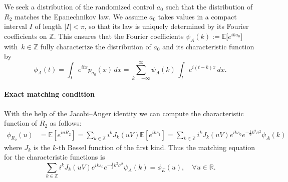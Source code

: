 \documentclass[reqno, 11pt]{amsart}%
\newcommand\EE{\mathbb E}
\newcommand\ZZ{\mathbb Z}
\theoremstyle{definition}
\begin{document}
We seek a distribution of the randomized control $a_0$ such that the distribution of $R_2$ matches the Epanechnikov law. 
We assume $a_0$ takes values in a compact interval $I$ of length $|I|<\pi$, so that its law is uniquely determined by its Fourier coefficients on $\mathbb Z$. This ensures that the Fourier coefficients $\psi_A(k):=\EE\big[e^{ik a_0}\big]$ with $\,k\in\ZZ $ fully characterize the distribution of $a_0$ and its  characteristic function by 
\begin{equation}
\phi_A(t) = \int_I e^{itx}p_{a_0}(x)\,dx = \sum_{k=-\infty}^{\infty} \psi_A(k)\,\int_I e^{i(t-k)x}\,dx.
\end{equation}

\paragraph{Exact matching condition}
With the help of the Jacobi--Anger identity we can compute the characteristic function of $R_2$ as follows:
\begin{align*}
\phi_{R_2}(u) &= \EE[e^{iu R_2}] = \sum_{k\in\mathbb Z} i^k J_k(u V)\EE[e^{iks_1}] = \sum_{k\in\mathbb Z} i^k J_k(u V )e^{iks_0}e^{-\frac12 k^2\sigma^2}\psi_A(k)
\end{align*}
where $J_k$ is the $k$-th Bessel function of the first kind. Thus the matching equation for the characteristic functions is
\begin{equation}
\label{eq:matching-functional}
 \sum_{k\in\mathbb Z} i^kJ_k(u V)e^{iks_0}e^{-\tfrac12 k^2\sigma^2}\psi_A(k) = \phi_E(u), \quad \forall u\in\mathbb R.
\end{equation}

\end{document}
